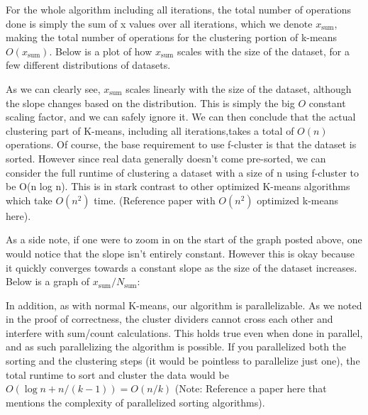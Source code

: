 \documentclass[conference]{IEEEtran}
\begin{document}
For the whole algorithm including all iterations, the total number of operations done is simply the sum of x values over all iterations,
which we denote $x_\text{sum}$, making the total number of operations for the clustering portion of k-means $O(x_\text{sum})$.
Below is a plot of how $x_\text{sum}$ scales with the size of the dataset, for a few different distributions of datasets.



As we can clearly see, $x_\text{sum}$ scales linearly with the size of the dataset, although the slope changes based on the distribution.
This is simply the big $O$ constant scaling factor, and we can safely ignore it.
We can then conclude that the actual clustering part of K-means, including all iterations,takes a total of $O(n)$ operations.
Of course, the base requirement to use f-cluster is that the dataset is sorted.
However since real data generally doesn’t come pre-sorted, we can consider the full runtime of clustering a dataset with a size of n using f-cluster to be O(n log n).
This is in stark contrast to other optimized K-means algorithms which take $O(n^2)$ time. (Reference paper with $O(n^2)$ optimized k-means here).

As a side note, if one were to zoom in on the start of the graph posted above, one would notice that the slope isn’t entirely constant.
However this is okay because it quickly converges towards a constant slope as the size of the dataset increases. Below is a graph of $x_\text{sum}/N_\text{sum}$:

In addition, as with normal K-means, our algorithm is parallelizable.
As we noted in the proof of correctness, the cluster dividers cannot cross each other and interfere with sum/count calculations.
This holds true even when done in parallel, and as such parallelizing the algorithm is possible.
If you parallelized both the sorting and the clustering steps (it would be pointless to parallelize just one), 
the total runtime to sort and cluster the data would be $O(\log n + n/(k-1)) = O(n/k)$ (Note: Reference a paper here that mentions the complexity of parallelized sorting algorithms).
\end{document}
